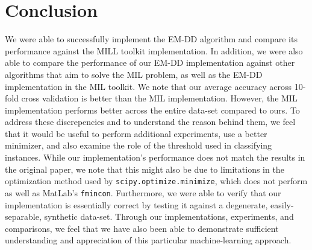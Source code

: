 \documentclass[conference]{IEEEtran}
\begin{document}
\section{Conclusion}

We were able to successfully implement the EM-DD algorithm and compare its performance against the MILL toolkit implementation. In addition, we were also able to compare the performance of our EM-DD implementation against other algorithms that aim to solve the MIL problem, as well as the EM-DD implementation in the MIL toolkit. We note that our average accuracy across 10-fold cross validation is better than the MIL implementation. However, the MIL implementation performs better across the entire data-set compared to ours. To address these discrepencies and to understand the reason behind them, we feel that it would be useful to perform additional experiments, use a better minimizer, and also examine the role of the threshold used in classifying instances. While our implementation's performance does not match the results in the original paper, we note that this might also be due to limitations in the optimization method used by \texttt{scipy.optimize.minimize}, which does not perform as well as MatLab's \texttt{fmincon}. Furthermore, we were able to verify that our implementation is essentially correct by testing it against a degenerate, easily-separable, synthetic data-set. Through our implementations, experiments, and comparisons, we feel that we have also been able to demonstrate sufficient understanding and appreciation of this particular machine-learning approach. 





%




\end{document}
